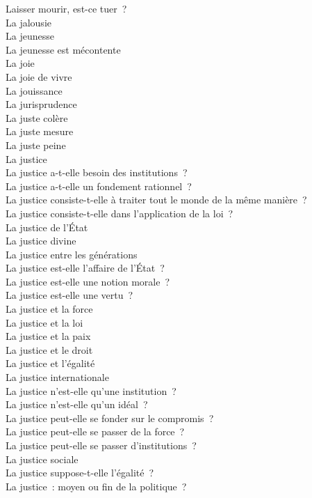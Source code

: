 \documentclass[a4paper,12pt]{article}
\begin{document}
Laisser mourir, est-ce tuer ? \\
La jalousie \\
La jeunesse \\
La jeunesse est mécontente \\
La joie \\
La joie de vivre \\
La jouissance \\
La jurisprudence \\
La juste colère \\
La juste mesure \\
La juste peine \\
La justice \\
La justice a-t-elle besoin des institutions ? \\
La justice a-t-elle un fondement rationnel ? \\
La justice consiste-t-elle à traiter tout le monde de la même manière ? \\
La justice consiste-t-elle dans l'application de la loi ? \\
La justice de l'État \\
La justice divine \\
La justice entre les générations \\
La justice est-elle l'affaire de l'État ? \\
La justice est-elle une notion morale ? \\
La justice est-elle une vertu ? \\
La justice et la force \\
La justice et la loi \\
La justice et la paix \\
La justice et le droit \\
La justice et l'égalité \\
La justice internationale \\
La justice n'est-elle qu'une institution ? \\
La justice n'est-elle qu'un idéal ? \\
La justice peut-elle se fonder sur le compromis ? \\
La justice peut-elle se passer de la force ? \\
La justice peut-elle se passer d'institutions ? \\
La justice sociale \\
La justice suppose-t-elle l'égalité ? \\
La justice : moyen ou fin de la politique ? \\
\end{document}
